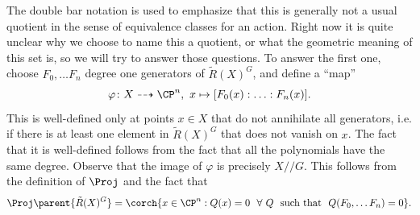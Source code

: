 
The double bar notation is used to emphasize that this is generally not a usual quotient in the sense of equivalence classes for an action. Right now it is quite unclear why we choose to name this a quotient, or what the geometric meaning of this set is, so we will try to answer those questions. To answer the first one, choose \(F_0, \ldots F_n\) degree one generators of \(\tilde{R}(X)^G\), and define a ``map''
\begin{equation} \label{eq_def_quot_proj}
\varphi\colon X \dashrightarrow \CP^n, \ x \mapsto [F_0(x): \ldots : F_n(x)].
\end{equation}
This is well-defined only at points \(x \in X\) that do not annihilate all generators, i.e. if there is at least one element in \(\tilde{R}(X)^G\) that does not vanish on \(x\). The fact that it is well-defined follows from the fact that all the polynomials have the same degree.  Observe that the image of \(\varphi\) is precisely \(X/\!\!/G\). This follows from the definition of \(\Proj\) and the fact that 
\[
\Proj \parent{\tilde{R}(X)^G}=\corch{x \in \CP^n: Q(x)=0 \ \ \forall \ Q \ \ \text{such that} \ \  Q(F_0, \ldots F_n)=0}.
\]


